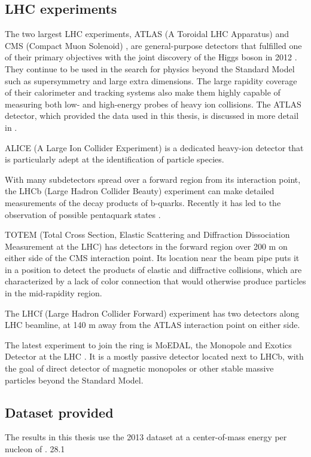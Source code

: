 \subsection{LHC experiments}
The two largest LHC experiments, ATLAS (A Toroidal LHC Apparatus) \cite{Aad:2008zzm} and CMS (Compact Muon Solenoid) \cite{Chatrchyan:2008aa}, are general-purpose detectors that fulfilled one of their primary objectives with the joint discovery of the Higgs boson in 2012 \cite{Aad:2012tfa,Chatrchyan:2012xdj}.
They continue to be used in the search for physics beyond the Standard Model such as supersymmetry and large extra dimensions.
The large rapidity coverage of their calorimeter and tracking systems also make them highly capable of measuring both low- and high-energy probes of heavy ion collisions.
The ATLAS detector, which provided the data used in this thesis, is discussed in more detail in .

ALICE (A Large Ion Collider Experiment) \cite{Aamodt:2008zz} is a dedicated heavy-ion detector that is particularly adept at the identification of particle species.

With many subdetectors spread over a forward region from its interaction point, the LHCb (Large Hadron Collider Beauty) experiment \cite{Alves:2008zz} can make detailed measurements of the decay products of b-quarks. Recently it has led to the observation of possible pentaquark states \cite{Aaij:2015tga}.

TOTEM (Total Cross Section, Elastic Scattering and Diffraction Dissociation Measurement at the LHC) \cite{Anelli:2008zza} has detectors in the forward region over 200 m on either side of the CMS interaction point.
Its location near the beam pipe puts it in a position to detect the products of elastic and diffractive collisions, which are characterized by a lack of color connection that would otherwise produce particles in the mid-rapidity region.

The LHCf (Large Hadron Collider Forward) experiment \cite{Adriani:2008zz} has two detectors along LHC beamline, at 140 m away from the ATLAS interaction point on either side.

The latest experiment to join the ring is MoEDAL, the Monopole and Exotics Detector at the LHC \cite{Acharya:2014nyr}.
It is a mostly passive detector located next to LHCb, with the goal of direct detector of magnetic monopoles or other stable massive particles beyond the Standard Model.

\subsection{Dataset provided}
The results in this thesis use the 2013 \pPb dataset at a center-of-mass energy per nucleon of \pPbenergy. 28.1 \inb

